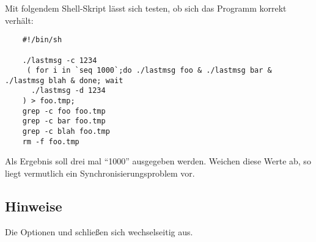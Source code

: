Mit folgendem Shell-Skript lässt sich testen, ob sich das Programm korrekt
verhält:

\begin{verbatim}
	#!/bin/sh

	./lastmsg -c 1234
	 ( for i in `seq 1000`;do ./lastmsg foo & ./lastmsg bar & ./lastmsg blah & done; wait
	  ./lastmsg -d 1234
	) > foo.tmp;
	grep -c foo foo.tmp
	grep -c bar foo.tmp
	grep -c blah foo.tmp
	rm -f foo.tmp
\end{verbatim}

Als Ergebnis soll drei mal "`1000"' ausgegeben werden. Weichen diese Werte
ab, so liegt vermutlich ein Synchronisierungsproblem vor.

\subsection*{Hinweise}

Die Optionen  und  schließen sich wechselseitig aus.

\osueguidelinesthree



